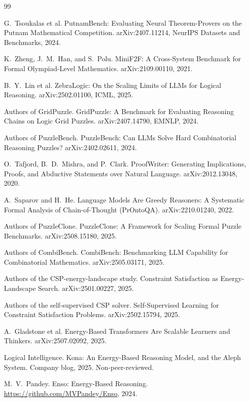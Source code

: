 \documentclass[11pt]{article}
\begin{document}
\begin{thebibliography}{99}

 G.~Tsoukalas et al. PutnamBench: Evaluating Neural
Theorem-Provers on the Putnam Mathematical Competition. arXiv:2407.11214, NeurIPS
Datasets and Benchmarks, 2024.

 K.~Zheng, J.~M.~Han, and S.~Polu. MiniF2F: A Cross-System
Benchmark for Formal Olympiad-Level Mathematics. arXiv:2109.00110, 2021.

 B.~Y.~Lin et al. ZebraLogic: On the Scaling Limits of LLMs
for Logical Reasoning. arXiv:2502.01100, ICML, 2025.

 Authors of GridPuzzle. GridPuzzle: A Benchmark for Evaluating
Reasoning Chains on Logic Grid Puzzles. arXiv:2407.14790, EMNLP, 2024.

 Authors of PuzzleBench. PuzzleBench: Can LLMs Solve Hard
Combinatorial Reasoning Puzzles? arXiv:2402.02611, 2024.

 O.~Tafjord, B.~D.~Mishra, and P.~Clark. ProofWriter:
Generating Implications, Proofs, and Abductive Statements over Natural Language.
arXiv:2012.13048, 2020.

 A.~Saparov and H.~He. Language Models Are Greedy Reasoners: A
Systematic Formal Analysis of Chain-of-Thought (PrOntoQA). arXiv:2210.01240, 2022.

 Authors of PuzzleClone. PuzzleClone: A Framework for Scaling
Formal Puzzle Benchmarks. arXiv:2508.15180, 2025.

 Authors of CombiBench. CombiBench: Benchmarking LLM
Capability for Combinatorial Mathematics. arXiv:2505.03171, 2025.

 Authors of the CSP-energy-landscape study. Constraint
Satisfaction as Energy-Landscape Search. arXiv:2501.00227, 2025.

 Authors of the self-supervised CSP solver. Self-Supervised
Learning for Constraint Satisfaction Problems. arXiv:2502.15794, 2025.

 A.~Gladstone et al. Energy-Based Transformers Are Scalable Learners
and Thinkers. arXiv:2507.02092, 2025.

 Logical Intelligence. Kona: An Energy-Based Reasoning Model, and
the Aleph System. Company blog, 2025. Non-peer-reviewed.

 M.~V.~Pandey. Enso: Energy-Based Reasoning.
\url{https://github.com/MVPandey/Enso}, 2024.

\end{thebibliography}
\end{document}
